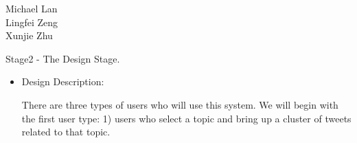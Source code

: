 \documentclass[10pt]{article}
\begin{document}
\begin{raggedright}
Michael Lan \\
Lingfei Zeng \\
Xunjie Zhu \\
\end{raggedright}

\vspace{5mm} 

Stage2 - The Design Stage. 
\begin{itemize} 
\item{ Design Description:\\} 
\begin{itemize}
There are three types of users who will use this system. We will begin with the first user type: 1) users who select a topic and bring up a cluster of tweets related to that topic.


\end{itemize}
\end{itemize}
\end{document}
